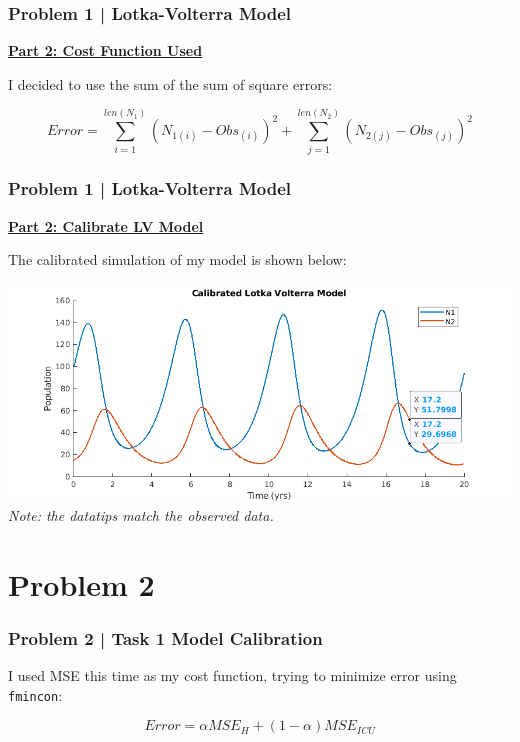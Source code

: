 \documentclass[aspectratio=1610]{beamer}
\begin{document}
\begin{frame}
\frametitle{Problem 1 | Lotka-Volterra Model}
\textbf{\underline{Part 2: Cost Function Used}}\

I decided to use the sum of the sum of square errors:
\vspace{1em}

\[ Error = \sum_{i = 1}^{len(N_1)}(N_{1(i)}-Obs_{(i)})^2  +  \sum_{j = 1}^{len(N_2)}(N_{2(j)}-Obs_{(j)})^2\]

\end{frame}

\begin{frame}
\frametitle{Problem 1 | Lotka-Volterra Model}
\textbf{\underline{Part 2: Calibrate LV Model}}
\vspace{1em}

The calibrated simulation of my model is shown below:
\vspace{.5em}

\centering
\includegraphics[width = .9\textwidth]{LV_calib} \\
\textit{Note: the datatips match the observed data.}

\end{frame}

\section{Problem 2}
\begin{frame}[fragile]
\frametitle{Problem 2 | Task 1 Model Calibration}

I used MSE this time as my cost function, trying to minimize error using \verb|fmincon|:
\vspace{1em}

\centering
\[ Error = \alpha MSE_H + (1-\alpha) MSE_{ICU} \]
\end{frame}
\end{document}
